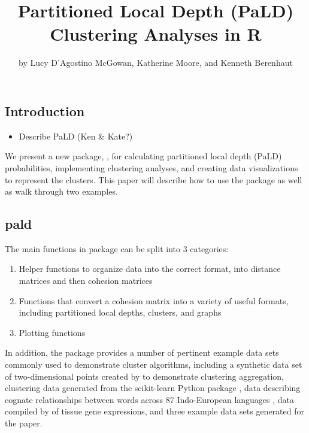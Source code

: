 \title{Partitioned Local Depth (PaLD) Clustering Analyses in R}
\author{by Lucy D'Agostino McGowan, Katherine Moore, and Kenneth Berenhaut}

\maketitle


\hypertarget{introduction}{%
\subsection{Introduction}\label{introduction}}

\begin{itemize}
\tightlist
\item
  Describe PaLD (Ken \& Kate?) \citep{berenhaut2022social}
\end{itemize}

We present a new package, , for calculating partitioned
local depth (PaLD) probabilities, implementing clustering analyses, and
creating data visualizations to represent the clusters. This paper will
describe how to use the package as well as walk through two examples.

\hypertarget{pald}{%
\subsection{pald}\label{pald}}

The main functions in  package can be split into 3
categories:

\begin{enumerate}
\def\labelenumi{\arabic{enumi}.}
\tightlist
\item
  Helper functions to organize data into the correct format, into
  distance matrices and then cohesion matrices
\item
  Functions that convert a cohesion matrix into a variety of useful
  formats, including partitioned local depths, clusters, and graphs
\item
  Plotting functions
\end{enumerate}

In addition, the package provides a number of pertinent example data
sets commonly used to demonstrate cluster algorithms, including a
synthetic data set of two-dimensional points created by
\citet{gionis1clustering} to demonstrate clustering aggregation,
clustering data generated from the scikit-learn Python package
\citep{pedregosa2011scikit}, data describing cognate relationships
between words across 87 Indo-European languages \citep{dyen92}, data
compiled by \cite{tissue} of tissue gene expressions, and three example
data sets generated for the \citet{berenhaut2022social} paper.

